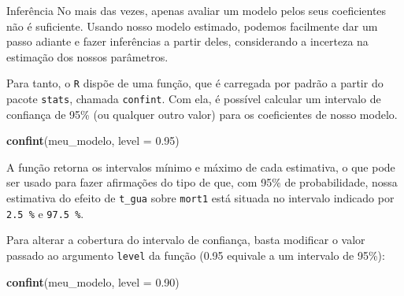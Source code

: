 \documentclass[
  9pt,
  ignorenonframetext,
  aspectratio=169]{beamer}
\newenvironment{Shaded}{\begin{snugshade}}{\end{snugshade}}
\newcommand{\DataTypeTok}[1]{\textcolor[rgb]{0.13,0.29,0.53}{#1}}
\newcommand{\FloatTok}[1]{\textcolor[rgb]{0.00,0.00,0.81}{#1}}
\newcommand{\KeywordTok}[1]{\textcolor[rgb]{0.13,0.29,0.53}{\textbf{#1}}}
\newcommand{\NormalTok}[1]{#1}
\begin{document}
\begin{frame}[fragile]{Inferência}
\protect\hypertarget{inferuxeancia}{}
No mais das vezes, apenas avaliar um modelo pelos seus coeficientes não
é suficiente. Usando nosso modelo estimado, podemos facilmente dar um
passo adiante e fazer inferências a partir deles, considerando a
incerteza na estimação dos nossos parâmetros.

Para tanto, o \texttt{R} dispõe de uma função, que é carregada por
padrão a partir do pacote \texttt{stats}, chamada \texttt{confint}. Com
ela, é possível calcular um intervalo de confiança de 95\% (ou qualquer
outro valor) para os coeficientes de nosso modelo.

\begin{Shaded}
\begin{Highlighting}[]
\KeywordTok{confint}\NormalTok{(meu\_modelo, }\DataTypeTok{level =} \FloatTok{0.95}\NormalTok{)}
\end{Highlighting}
\end{Shaded}

A função retorna os intervalos mínimo e máximo de cada estimativa, o que
pode ser usado para fazer afirmações do tipo de que, com 95\% de
probabilidade, nossa estimativa do efeito de \texttt{t\_gua} sobre
\texttt{mort1} está situada no intervalo indicado por \texttt{2.5\ \%} e
\texttt{97.5\ \%}.

Para alterar a cobertura do intervalo de confiança, basta modificar o
valor passado ao argumento \texttt{level} da função (0.95 equivale a um
intervalo de 95\%):

\begin{Shaded}
\begin{Highlighting}[]
\KeywordTok{confint}\NormalTok{(meu\_modelo, }\DataTypeTok{level =} \FloatTok{0.90}\NormalTok{)}
\end{Highlighting}
\end{Shaded}
\end{frame}
\end{document}

